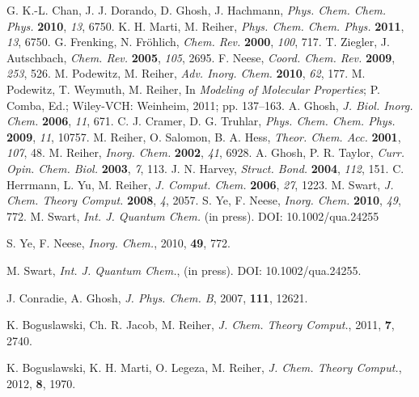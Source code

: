\documentclass[%
 preprint, linenumbers,
 amsmath,amssymb,
 aps, physrev,
]{revtex4-2}
\begin{document}
\begin{thebibliography}{144}
 G. K.-L. Chan, J. J. Dorando, D. Ghosh, J. Hachmann, \textit{Phys. Chem. Chem. Phys.} \textbf{2010}, \textit{13}, 6750.
 K. H. Marti, M. Reiher, \textit{Phys. Chem. Chem. Phys.} \textbf{2011}, \textit{13}, 6750.
 G. Frenking, N. Fr\"ohlich, \textit{Chem. Rev.} \textbf{2000}, \textit{100}, 717.
 T. Ziegler, J. Autschbach, \textit{Chem. Rev.} \textbf{2005}, \textit{105}, 2695.
 F. Neese, \textit{Coord. Chem. Rev.} \textbf{2009}, \textit{253}, 526.
 M. Podewitz, M. Reiher, \textit{Adv. Inorg. Chem.} \textbf{2010}, \textit{62}, 177.
 M. Podewitz, T. Weymuth, M. Reiher, In \textit{Modeling of Molecular Properties}; P. Comba, Ed.; Wiley-VCH: Weinheim, 2011; pp. 137–163.
 A. Ghosh, \textit{J. Biol. Inorg. Chem.} \textbf{2006}, \textit{11}, 671.
 C. J. Cramer, D. G. Truhlar, \textit{Phys. Chem. Chem. Phys.} \textbf{2009}, \textit{11}, 10757.
 M. Reiher, O. Salomon, B. A. Hess, \textit{Theor. Chem. Acc.} \textbf{2001}, \textit{107}, 48.
 M. Reiher, \textit{Inorg. Chem.} \textbf{2002}, \textit{41}, 6928.
 A. Ghosh, P. R. Taylor, \textit{Curr. Opin. Chem. Biol.} \textbf{2003}, \textit{7}, 113.
 J. N. Harvey, \textit{Struct. Bond.} \textbf{2004}, \textit{112}, 151.
 C. Herrmann, L. Yu, M. Reiher, \textit{J. Comput. Chem.} \textbf{2006}, \textit{27}, 1223.
 M. Swart, \textit{J. Chem. Theory Comput.} \textbf{2008}, \textit{4}, 2057.
 S. Ye, F. Neese, \textit{Inorg. Chem.} \textbf{2010}, \textit{49}, 772.
 M. Swart, \textit{Int. J. Quantum Chem.} (in press). DOI: 10.1002/qua.24255



 S. Ye, F. Neese, \textit{Inorg. Chem.}, 2010, \textbf{49}, 772.

 M. Swart, \textit{Int. J. Quantum Chem.}, (in press). DOI: 10.1002/qua.24255.

 J. Conradie, A. Ghosh, \textit{J. Phys. Chem. B}, 2007, \textbf{111}, 12621.

 K. Boguslawski, Ch. R. Jacob, M. Reiher, \textit{J. Chem. Theory Comput.}, 2011, \textbf{7}, 2740.

 K. Boguslawski, K. H. Marti, O. Legeza, M. Reiher, \textit{J. Chem. Theory Comput.}, 2012, \textbf{8}, 1970.


\end{thebibliography}
\end{document}
